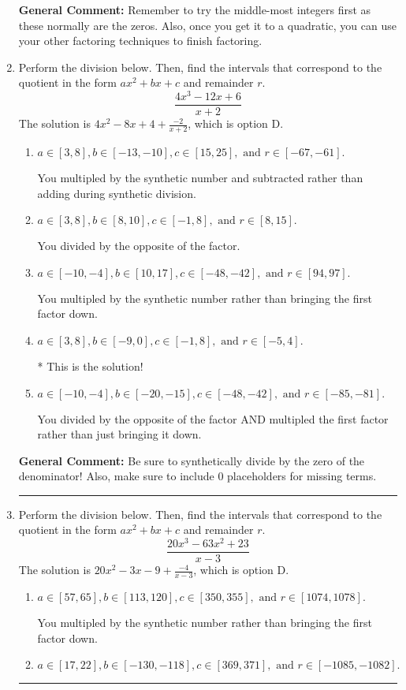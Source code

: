 \documentclass{extbook}[14pt]
\newcommand{\litem}[1]{\item #1

\rule{\textwidth}{0.4pt}}
\begin{document}
\begin{enumerate}
{\textbf{General Comment:} Remember to try the middle-most integers first as these normally are the zeros. Also, once you get it to a quadratic, you can use your other factoring techniques to finish factoring.
}
\litem{
Perform the division below. Then, find the intervals that correspond to the quotient in the form $ax^2+bx+c$ and remainder $r$.
\[ \frac{4x^{3} -12 x + 6}{x + 2} \]The solution is \( 4x^{2} -8 x + 4 + \frac{-2}{x + 2} \), which is option D.\begin{enumerate}[label=\Alph*.]
\item \( a \in [3, 8], b \in [-13, -10], c \in [15, 25], \text{ and } r \in [-67, -61]. \)

 You multipled by the synthetic number and subtracted rather than adding during synthetic division.
\item \( a \in [3, 8], b \in [8, 10], c \in [-1, 8], \text{ and } r \in [8, 15]. \)

 You divided by the opposite of the factor.
\item \( a \in [-10, -4], b \in [10, 17], c \in [-48, -42], \text{ and } r \in [94, 97]. \)

 You multipled by the synthetic number rather than bringing the first factor down.
\item \( a \in [3, 8], b \in [-9, 0], c \in [-1, 8], \text{ and } r \in [-5, 4]. \)

* This is the solution!
\item \( a \in [-10, -4], b \in [-20, -15], c \in [-48, -42], \text{ and } r \in [-85, -81]. \)

 You divided by the opposite of the factor AND multipled the first factor rather than just bringing it down.
\end{enumerate}

\textbf{General Comment:} Be sure to synthetically divide by the zero of the denominator! Also, make sure to include 0 placeholders for missing terms.
}
\litem{
Perform the division below. Then, find the intervals that correspond to the quotient in the form $ax^2+bx+c$ and remainder $r$.
\[ \frac{20x^{3} -63 x^{2} + 23}{x -3} \]The solution is \( 20x^{2} -3 x -9 + \frac{-4}{x -3} \), which is option D.\begin{enumerate}[label=\Alph*.]
\item \( a \in [57, 65], b \in [113, 120], c \in [350, 355], \text{ and } r \in [1074, 1078]. \)

 You multipled by the synthetic number rather than bringing the first factor down.
\item \( a \in [17, 22], b \in [-130, -118], c \in [369, 371], \text{ and } r \in [-1085, -1082]. \)


\end{enumerate}}
\end{enumerate}
\end{document}

